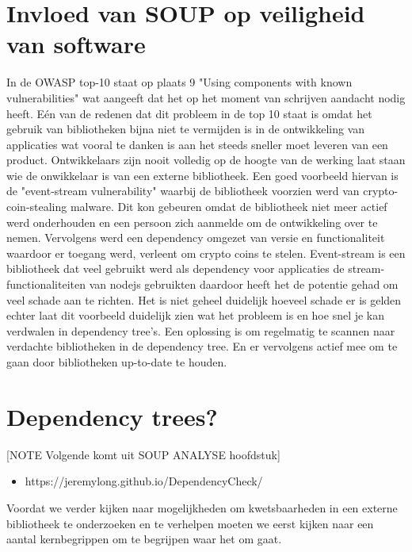 \section{Invloed van SOUP op veiligheid van software}\label{sec:invloed-van-soup-op-veiligheid-van-software}
In de OWASP top-10 staat op plaats 9 "Using components with known vulnerabilities" wat aangeeft dat het op het moment van schrijven aandacht nodig heeft.
Eén van de redenen dat dit probleem in de top 10 staat is omdat het gebruik van bibliotheken bijna niet te vermijden is in de ontwikkeling van applicaties wat vooral te danken is aan het steeds sneller moet leveren van een product.
Ontwikkelaars zijn nooit volledig op de hoogte van de werking laat staan wie de onwikkelaar is van een externe bibliotheek.
Een goed voorbeeld hiervan is de "event-stream vulnerability" waarbij de bibliotheek voorzien werd van crypto-coin-stealing malware.
Dit kon gebeuren omdat de bibliotheek niet meer actief werd onderhouden en een persoon zich aanmelde om de ontwikkeling over te nemen.
Vervolgens werd een dependency omgezet van versie en functionaliteit waardoor er toegang werd, verleent om crypto coins te stelen.
Event-stream is een bibliotheek dat veel gebruikt werd als dependency voor applicaties de stream-functionaliteiten van nodejs gebruikten daardoor heeft het de potentie gehad om veel schade aan te richten.
Het is niet geheel duidelijk hoeveel schade er is gelden echter laat dit voorbeeld duidelijk zien wat het probleem is en hoe snel je kan verdwalen in dependency tree's.
Een oplossing is om regelmatig te scannen naar verdachte bibliotheken in de dependency tree.
En er vervolgens actief mee om te gaan door bibliotheken up-to-date te houden.

\section{Dependency trees?}\label{sec:dependency-trees?}



[NOTE Volgende komt uit SOUP ANALYSE hoofdstuk]

\begin{itemize}
    \item https://jeremylong.github.io/DependencyCheck/
\end{itemize}

Voordat we verder kijken naar mogelijkheden om kwetsbaarheden in een externe bibliotheek te onderzoeken en te verhelpen moeten we eerst kijken naar een aantal kernbegrippen om te begrijpen waar het om gaat.

